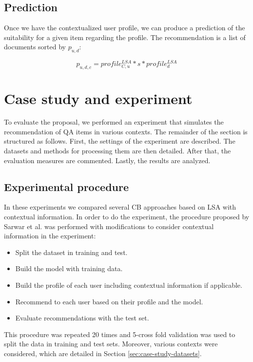 \documentclass[preprint]{elsarticle}
\begin{document}
\begin{spacing}{1.5}
\subsection{Prediction}

Once we have the contextualized user profile, we can produce a prediction of the suitability for a given item regarding the profile. The recommendation is a list of documents sorted by $p_{u,d}$:

\begin{equation}
	p_{u,d,c} = profile^{LSA}_{C,u}*s*profile^{LSA}_d
\end{equation}

\section{Case study and experiment}
\label{sec:case-study}

To evaluate the proposal, we performed an experiment that simulates the recommendation of QA items in various contexts. The remainder of the section is structured as follows. First, the settings of the experiment are described. The datasets and methods for processing them are then detailed. After that, the evaluation measures are commented. Lastly, the results are analyzed.

\subsection{Experimental procedure}

In these experiments we compared several CB approaches based on LSA with contextual information. In order to do the experiment, the procedure proposed by Sarwar et al. \cite{Sarwar2001}  was performed with modifications to consider contextual information in the experiment:
\begin{itemize}
	\item Split the dataset in training and test.
	\item Build the model with training data.
	\item Build the profile of each user including contextual information if applicable.
	\item Recommend to each user based on their profile and the model.
	\item Evaluate recommendations with the test set.
\end{itemize}

This procedure was repeated 20 times and 5-cross fold validation was used to split the data in training and test sets. Moreover, various contexts were considered, which are detailed in Section \ref{sec:case-study-datasets}.


\end{spacing}
\end{document}
